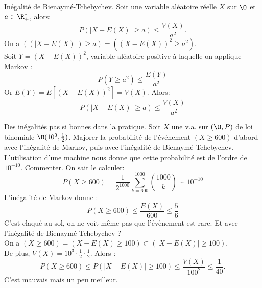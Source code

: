 \documentclass[11pt]{article}
\begin{document}
\pagebreak

\begin{prop}{Inégalité de Bienaymé-Tchebychev.}{}
    Soit une variable aléatoire réelle $X$ sur $\O$ et $a\in\R^*_+$, alors:
    \begin{equation*}
        P(|X-E(X)|\geq a)\leq\frac{V(X)}{a^2}.
    \end{equation*}
    \tcblower
    On a $((|X-E(X)|)\geq a) = ((X-E(X))^2\geq a^2)$.\\
    Soit $Y=(X-E(X))^2$, variable aléatoire positive à laquelle on applique Markov :
    \begin{equation*}
        P(Y\geq a^2) \leq \frac{E(Y)}{a^2}
    \end{equation*}
    Or $E(Y)=E\left[ (X-E(X))^2 \right]=V(X).$ Alors:
    \begin{equation*}
        P(|X-E(X)|\geq a)\leq\frac{V(X)}{a^2}
    \end{equation*}
\end{prop}

\begin{ex}{Des inégalités pas si bonnes dans la pratique.}{}
    Soit $X$ une v.a. sur $(\O,P)$ de loi binomiale $\B(10^3,\frac{1}{2})$. Majorer la probabilité de l'événement $(X\geq600)$ d'abord avec l'inégalité de Markov, puis avec l'inégalité de Bienaymé-Tchebychev. L'utilisation d'une machine nous donne que cette probabilité est de l'ordre de $10^{-10}$. Commenter.
    \tcblower
    On sait le calculer:
    \begin{equation*}
        P(X\geq600)=\frac{1}{2^{1000}}\sum_{k=600}^{1000}\binom{1000}{k}\sim 10^{-10}
    \end{equation*}
    L'inégalité de Markov donne :
    \begin{equation*}
        P(X\geq600)\leq\frac{E(X)}{600}\leq\frac{5}{6}
    \end{equation*}
    C'est claqué au sol, on ne voit même pas que l'évènement est rare.\n
    Et avec l'inégalité de Bienaymé-Tchebychev ?\\
    On a $(X\geq600)=(X-E(X)\geq100)\subset(|X-E(X)|\geq100)$.\\
    De plus, $V(X)=10^3\cdot\frac{1}{2}\cdot\frac{1}{2}$. Alors :
    \begin{equation*}
        P(X\geq600)\leq P(|X-E(X)|\geq100) \leq \frac{V(X)}{100^2}\leq\frac{1}{40}.
    \end{equation*}
    C'est mauvais mais un peu meilleur.
\end{ex}
\end{document}
